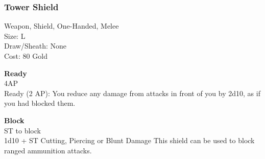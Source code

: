 \subsubsection{Tower Shield}\label{weapon:towerShield}
Weapon, Shield, One-Handed, Melee\\
Size: L\\
Draw/Sheath: None\\
Cost: 80 Gold

\textbf{Ready}\\
4AP\\
Ready (2 AP): You reduce any damage from attacks in front of you by 2d10, as if you had blocked them.

\textbf{Block}\\
ST to block\\
1d10 + \texttimes ST Cutting, Piercing or Blunt Damage
This shield can be used to block ranged ammunition attacks.\\